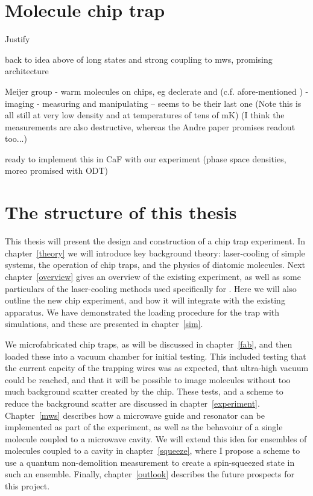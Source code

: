 \section{Molecule chip trap}

Justify

back to idea above of long states and strong coupling to mws, promising
architecture \cite{Andre2006}

Meijer group
- warm molecules on chips, eg declerate \cite{Meek2008} and \cite{Meek2009}
(c.f. afore-mentioned \cite{Bethlem1999})
- imaging \cite{Marx2013}
- measuring and manipulating \cite{PhysRevA.92.063408} -- seems to be their
last one
(Note this is all still at very low density and at temperatures of tens of mK)
(I think the measurements are also destructive, whereas the Andre paper
promises readout too...)


ready to implement this in CaF with our experiment (phase space densities,
moreo promised with ODT)

\section{The structure of this thesis}

This thesis will present the design and construction of a \CaF{} chip trap
experiment. In chapter~\ref{theory} we will introduce key background theory: 
laser-cooling of simple systems, the operation of chip traps, and the physics
of diatomic molecules. Next chapter~\ref{overview} gives an overview of the
existing \CaF{} experiment, as well as some particulars of the laser-cooling
methods used specifically for \CaF{}. Here we will also outline the new chip
experiment, and how it will integrate with the existing apparatus. We have
demonstrated the loading procedure for the trap with simulations, and these are
presented in chapter~\ref{sim}.

We microfabricated chip traps, as will be discussed in chapter~\ref{fab}, and
then loaded these into a vacuum chamber for initial testing. This included
testing that the current capcity of the trapping wires was as expected, that
ultra-high vacuum could be reached, and that it will be possible to image
molecules without too much background scatter created by the chip. These tests,
and a scheme to reduce the background scatter are discussed in
chapter~\ref{experiment}. Chapter~\ref{mws} describes how a microwave guide and
resonator can be implemented as part of the experiment, as well as the
behavoiur of a single molecule coupled to a microwave cavity. We will extend
this idea for ensembles of molecules coupled to a cavity in
chapter~\ref{squeeze}, where I propose a scheme to use a quantum non-demolition
measurement to create a spin-squeezed state in such an ensemble. Finally,
chapter~\ref{outlook} describes the future prospects for this project.
